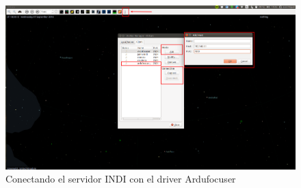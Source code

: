 \begin{figure}
	\centering
	\includegraphics[width=1\linewidth]{../images/test_1}
	\caption{Conectando el servidor INDI con el driver Ardufocuser}
	\label{fig:test_1}
\end{figure}

 

